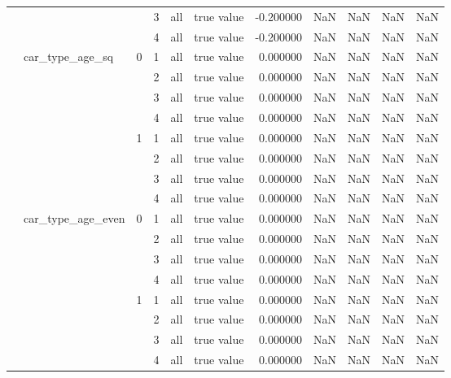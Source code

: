 \begin{tabular}{llllllrrrrr}
\cline{4-11} \cline{5-11}
 &  &  & 3 & all & true value & -0.200000 & NaN & NaN & NaN & NaN \\
\cline{4-11} \cline{5-11}
 &  &  & 4 & all & true value & -0.200000 & NaN & NaN & NaN & NaN \\
\cline{2-11} \cline{3-11} \cline{4-11} \cline{5-11}
 & \multirow[t]{8}{*}{car_type_age_sq} & \multirow[t]{4}{*}{0} & 1 & all & true value & 0.000000 & NaN & NaN & NaN & NaN \\
\cline{4-11} \cline{5-11}
 &  &  & 2 & all & true value & 0.000000 & NaN & NaN & NaN & NaN \\
\cline{4-11} \cline{5-11}
 &  &  & 3 & all & true value & 0.000000 & NaN & NaN & NaN & NaN \\
\cline{4-11} \cline{5-11}
 &  &  & 4 & all & true value & 0.000000 & NaN & NaN & NaN & NaN \\
\cline{3-11} \cline{4-11} \cline{5-11}
 &  & \multirow[t]{4}{*}{1} & 1 & all & true value & 0.000000 & NaN & NaN & NaN & NaN \\
\cline{4-11} \cline{5-11}
 &  &  & 2 & all & true value & 0.000000 & NaN & NaN & NaN & NaN \\
\cline{4-11} \cline{5-11}
 &  &  & 3 & all & true value & 0.000000 & NaN & NaN & NaN & NaN \\
\cline{4-11} \cline{5-11}
 &  &  & 4 & all & true value & 0.000000 & NaN & NaN & NaN & NaN \\
\cline{2-11} \cline{3-11} \cline{4-11} \cline{5-11}
 & \multirow[t]{8}{*}{car_type_age_even} & \multirow[t]{4}{*}{0} & 1 & all & true value & 0.000000 & NaN & NaN & NaN & NaN \\
\cline{4-11} \cline{5-11}
 &  &  & 2 & all & true value & 0.000000 & NaN & NaN & NaN & NaN \\
\cline{4-11} \cline{5-11}
 &  &  & 3 & all & true value & 0.000000 & NaN & NaN & NaN & NaN \\
\cline{4-11} \cline{5-11}
 &  &  & 4 & all & true value & 0.000000 & NaN & NaN & NaN & NaN \\
\cline{3-11} \cline{4-11} \cline{5-11}
 &  & \multirow[t]{4}{*}{1} & 1 & all & true value & 0.000000 & NaN & NaN & NaN & NaN \\
\cline{4-11} \cline{5-11}
 &  &  & 2 & all & true value & 0.000000 & NaN & NaN & NaN & NaN \\
\cline{4-11} \cline{5-11}
 &  &  & 3 & all & true value & 0.000000 & NaN & NaN & NaN & NaN \\
\cline{4-11} \cline{5-11}
 &  &  & 4 & all & true value & 0.000000 & NaN & NaN & NaN & NaN \\

\end{tabular}
